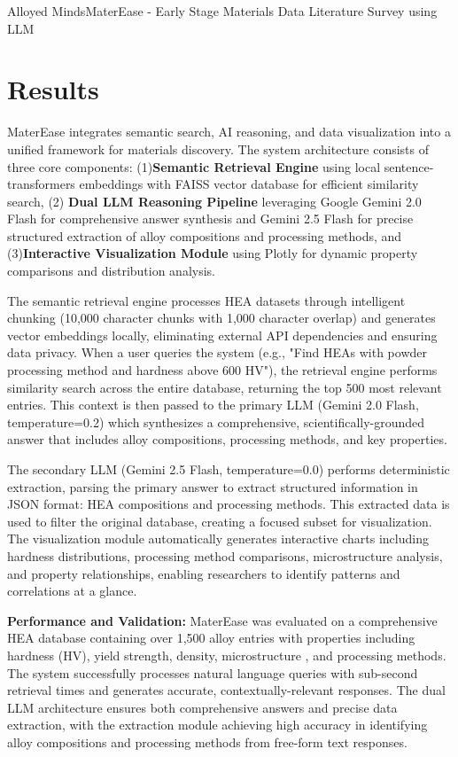 \begin{teamsubmission}{Alloyed Minds}{MaterEase - Early Stage Materials Data Literature Survey using LLM}
\section*{Results}
MaterEase integrates semantic search, AI reasoning, and data visualization into a unified framework for materials discovery. The system architecture consists of three core components: (1)\textbf{Semantic Retrieval Engine} using local sentence-transformers embeddings with FAISS vector database for efficient similarity search, (2) \textbf{Dual LLM Reasoning Pipeline} leveraging Google Gemini 2.0 Flash for comprehensive answer synthesis and Gemini 2.5 Flash for precise structured extraction of alloy compositions and processing methods, and (3)\textbf{Interactive Visualization Module} using Plotly for dynamic property comparisons and distribution analysis.

The semantic retrieval engine processes HEA datasets through intelligent chunking (10,000 character chunks with 1,000 character overlap) and generates vector embeddings locally, eliminating external API dependencies and ensuring data privacy. When a user queries the system (e.g., "Find HEAs with powder processing method and hardness above 600 HV"), the retrieval engine performs similarity search across the entire database, returning the top 500 most relevant entries. This context is then passed to the primary LLM (Gemini 2.0 Flash, temperature=0.2) which synthesizes a comprehensive, scientifically-grounded answer that includes alloy compositions, processing methods, and key properties.

The secondary LLM (Gemini 2.5 Flash, temperature=0.0) performs deterministic extraction, parsing the primary answer to extract structured information in JSON format: HEA compositions and processing methods. This extracted data is used to filter the original database, creating a focused subset for visualization. The visualization module automatically generates interactive charts including hardness distributions, processing method comparisons, microstructure analysis, and property relationships, enabling researchers to identify patterns and correlations at a glance.

\textbf{Performance and Validation:} MaterEase was evaluated on a comprehensive HEA database containing over 1,500 alloy entries with properties including hardness (HV), yield strength, density, microstructure \cite{miracle2017critical,zhang2014microstructures}, and processing methods. The system successfully processes natural language queries with sub-second retrieval times and generates accurate, contextually-relevant responses. The dual LLM architecture ensures both comprehensive answers and precise data extraction, with the extraction module achieving high accuracy in identifying alloy compositions and processing methods from free-form text responses.


\end{teamsubmission}
